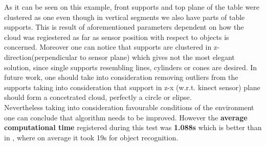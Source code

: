 \documentclass[fontsize=12pt]{article}
\begin{document}
As it can be seen on this example, front supports and top plane of the table were clustered as one even though in vertical segments we also have parts of table supports. This is result of aforementioned parameters dependent on how the cloud was regiestered as far as sensor position with respect to objects is concerned. Moreover one can notice that supports are clustered in z-direction(perpendicular to sensor plane) which gives not the most elegant solution, since single supports  resembling lines, cylinders or cones are desired. In future work, one should take into consideration removing outliers from the supports taking into consideration that support in z-x (w.r.t. kinect sensor) plane should form a concetrated cloud, perfectly a circle or elipse.\\ 

 Nevertheless taking into consideration favourable conditions of the environment one can conclude that algorithm needs to be improved. However the \textbf{average computational time} registered during this test was \textbf{1.088s} which is better than in \cite{pap1}, where on average it took 19s for object recognition.
\end{document}
